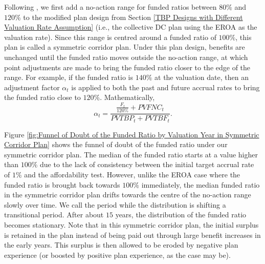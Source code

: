 \documentclass{sfuthesis}
\numberwithin{equation}{chapter}
\begin{document}
		\justify
		Following \citet{Sanders2016a}, we first add a no-action range for funded ratios between $80\%$ and $120\%$ to the modified plan design from Section \ref{TBP Designs with Different Valuation Rate Assumption} (i.e., the collective DC plan using the EROA as the valuation rate). Since this range is centred around a funded ratio of $100\%$, this plan is called a symmetric corridor plan. Under this plan design, benefits are unchanged until the funded ratio moves outside the no-action range, at which point adjustments are made to bring the funded ratio closer to the edge of the range. For example, if the funded ratio is $140\%$ at the valuation date, then an adjustment factor $\alpha_{t}$ is applied to both the past and future accrual rates to bring the funded ratio close to $120\%$. Mathematically,
	     \begin{equation}
			\label{eq:CDTBP_1}
			\alpha_{t} = \frac{\frac{F_{t}}{120\%}+PVFNC_{t}}{PVTBP_{t} + PVTBF_{t}}.
	     \end{equation}
     
 	\vspace{-0.2cm}
     
     \justify
		Figure \ref{fig:Funnel of Doubt of the Funded Ratio by Valuation Year in Symmetric Corridor Plan} shows the funnel of doubt of the funded ratio under our symmetric corridor plan. The median of the funded ratio starts at a value higher than $100\%$ due to the lack of consistency between the initial target accrual rate of $1\%$ and the affordability test. However, unlike  the EROA case where the funded ratio is brought back towards $100\%$ immediately, the median funded ratio in the symmetric corridor plan drifts towards the centre of the no-action range slowly over time. We call the period while the distribution is shifting a transitional period. After about $15$ years, the distribution of the funded ratio becomes stationary. Note that in this symmetric corridor plan, the initial surplus is retained in the plan  instead of being paid out through large benefit increases in the early years. This surplus is then allowed to be eroded by negative plan experience (or boosted by positive plan experience, as the case may be).
\end{document}
